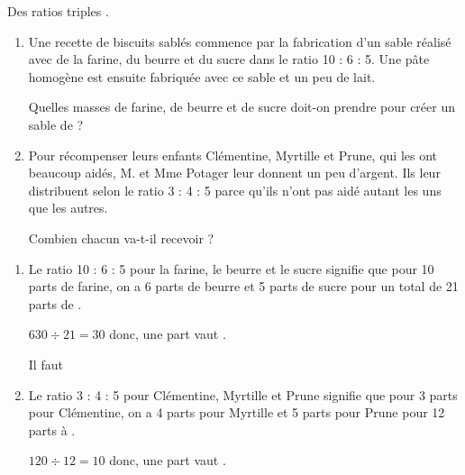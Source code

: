 \begin{Maquette}[Fiche,CorrigeFin,Colonnes=2]{}
\begin{multicols}{2}
      \begin{exercice} %
         Des ratios \og triples \fg.
         \begin{enumerate}
            \item Une recette de biscuits sablés commence par la fabrication d'un \og sable \fg{} réalisé avec de la farine, du beurre et du sucre dans le ratio 10 : 6 : 5. Une pâte homogène est ensuite fabriquée avec ce sable et un peu de lait. \par
               Quelles masses de farine, de beurre et de sucre doit-on prendre pour créer un \og sable \fg{} de  ?
            \item Pour récompenser leurs enfants Clémentine, Myrtille et Prune, qui les ont beaucoup aidés, M. et Mme Potager leur donnent un peu d'argent. Ils leur distribuent  selon le ratio 3 : 4 : 5 parce qu'ils n'ont pas aidé autant les uns que les autres. \par
               Combien chacun va-t-il recevoir ?
         \end{enumerate}
      \end{exercice}
      
      \begin{Solution}
         \begin{enumerate}
            \item Le ratio 10 : 6 : 5 pour la farine, le beurre et le sucre signifie que pour 10 parts de farine, on a 6 parts de beurre et 5 parts de sucre pour un total de 21 parts de . \par
               \qquad {} \par
               $630\div21 =30$ donc, une part vaut . \par
               Il faut 
            \item Le ratio 3 : 4 : 5 pour Clémentine, Myrtille et Prune signifie que pour 3 parts pour Clémentine, on a 4 parts pour Myrtille et 5 parts pour Prune pour 12 parts à . \par
               $120\div12 =10$ donc, une part vaut . \par
         \end{enumerate}
      \end{Solution}
      

\end{multicols}
\end{Maquette}
